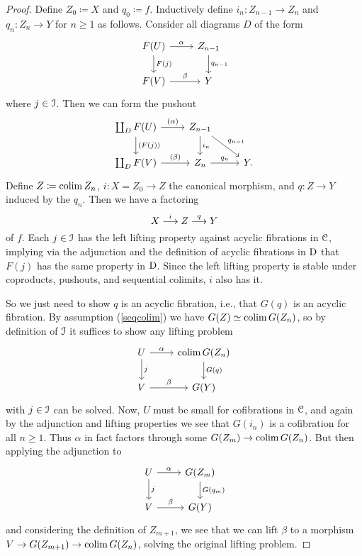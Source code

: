\begin{proof}
  Define $Z_0 \coloneqq X$ and $q_0 \coloneqq f$. Inductively define
  $i_n : Z_{n-1} \to Z_n$ and $q_n : Z_n \to Y$ for $n \ge 1$ as
  follows. Consider all diagrams $D$ of the form
  \[
  \begin{tikzcd}
    F(U) \rar{\alpha} \dar{F(j)} & Z_{n-1} \dar{q_{n-1}} \\ F(V)
    \rar{\beta} & Y
  \end{tikzcd}
  \]
  where $j \in \mathcal{I}$. Then we can form the pushout
  \[
  \begin{tikzcd}
    \coprod_D F(U) \rar{(\alpha)} \dar{(F(j))} & Z_{n-1} \dar{i_n}
    \drar{q_{n-1}} \\ \coprod_D F(V) \rar{(\beta)} & Z_n \rar{q_n} &
    Y.
  \end{tikzcd}
  \]
  Define $Z \coloneqq \operatorname{colim} Z_n$, $i : X = Z_0 \to Z$ the canonical
  morphism, and $q : Z \to Y$ induced by the $q_n$. Then we have a
  factoring
  \[
  X \overset{i}{\longrightarrow} Z \overset{q}{\longrightarrow} Y
  \]
  of $f$. Each $j \in \mathcal{I}$ has the left lifting property against
  acyclic fibrations in $\mathcal{C}$, implying via the adjunction and the
  definition of acyclic fibrations in $\mathrm{D}$ that $F(j)$ has the same
  property in $\mathrm{D}$. Since the left lifting property is stable under
  coproducts, pushouts, and sequential colimits, $i$ also has it.

  So we just need to show $q$ is an acyclic fibration, i.e., that
  $G(q)$ is an acyclic fibration. By assumption (\ref{seqcolim}) we
  have $G(Z) \simeq \operatorname{colim} G(Z_n)$, so by definition of $\mathcal{I}$ it
  suffices to show any lifting problem
  \[
  \begin{tikzcd}
    U \rar{\alpha} \dar{j} & \colim G(Z_n) \dar{G(q)} \\ V \rar{\beta}
    & G(Y)
  \end{tikzcd}
  \]
  with $j \in \mathcal{I}$ can be solved. Now, $U$ must be small for
  cofibrations in $\mathcal{C}$, and again by the adjunction and lifting
  properties we see that $G(i_n)$ is a cofibration for all $n \ge
  1$. Thus $\alpha$ in fact factors through some $G(Z_m) \to \operatorname{colim}
  G(Z_n)$. But then applying the adjunction to
  \[
  \begin{tikzcd}
    U \rar{\alpha} \dar{j} & G(Z_m) \dar{G(q_m)} \\ V \rar{\beta} &
    G(Y)
  \end{tikzcd}
  \]
  and considering the definition of $Z_{m+1}$, we see that we can lift
  $\beta$ to a morphism $V \to G(Z_{m+1}) \to \operatorname{colim} G(Z_n)$, solving
  the original lifting problem.
\end{proof}

